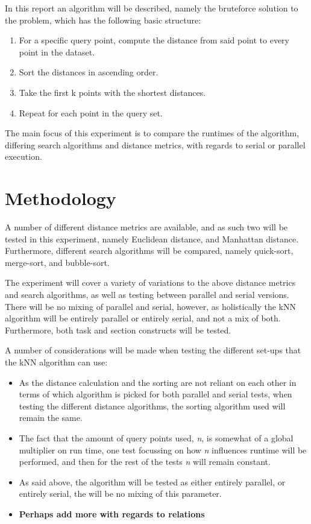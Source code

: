 \documentclass[a4paper,twoside,11pt]{report}
\begin{document}
In this report an algorithm will be described, namely the bruteforce solution to the problem, which has the following basic structure:
\begin{enumerate}
	\item For a specific query point, compute the distance from said point to every point in the dataset.
	\item Sort the distances in ascending order.
	\item Take the first k points with the shortest distances.
	\item Repeat for each point in the query set.
\end{enumerate}

The main focus of this experiment is to compare the runtimes of the algorithm, differing search algorithms and distance metrics, with regards to serial or parallel execution.

\section*{Methodology}
A number of different distance metrics are available, and as such two will be tested in this experiment, namely Euclidean distance, and Manhattan distance. Furthermore, different search algorithms will be compared, namely quick-sort, merge-sort, and bubble-sort.

The experiment will cover a variety of variations to the above distance metrics and search algorithms, as well as testing between parallel and serial versions. There will be no mixing of parallel and serial, however, as holistically the kNN algorithm will be entirely parallel or entirely serial, and not a mix of both. Furthermore, both task and section constructs will be tested.

A number of considerations will be made when testing the different set-ups that the kNN algorithm can use:
\begin{itemize}
	\item As the distance calculation and the sorting are not reliant on each other in terms of which algorithm is picked for both parallel and serial tests, when testing the different distance algorithms, the sorting algorithm used will remain the same.
	\item The fact that the amount of query points used, \textit{n}, is somewhat of a global multiplier on run time, one test focussing on how \textit{n} influences runtime will be performed, and then for the rest of the tests \textit{n} will remain constant.
	\item As said above, the algorithm will be tested as either entirely parallel, or entirely serial, the will be no mixing of this parameter.
	\item \textbf{Perhaps add more with regards to relations}
\end{itemize}
\end{document}
